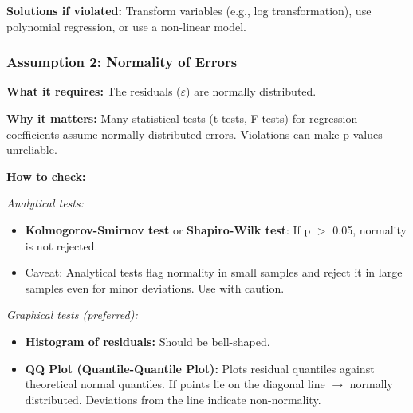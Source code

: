 \documentclass[12pt,openany]{book}
\begin{document}
\begin{center}
\end{center}



\textbf{Solutions if violated:} Transform variables (e.g., log transformation), use polynomial regression, or use a non-linear model.

\medskip


\subsubsection{Assumption 2: Normality of Errors}


\textbf{What it requires:} The residuals (\(\varepsilon\)) are normally distributed.

\textbf{Why it matters:} Many statistical tests (t-tests, F-tests) for regression coefficients assume normally distributed errors. Violations can make p-values unreliable.

\textbf{How to check:}

\textit{Analytical tests:}
\begin{itemize}[leftmargin=*]
    \item \textbf{Kolmogorov-Smirnov test} or \textbf{Shapiro-Wilk test}: If p \(>\) 0.05, normality is not rejected.
    \item Caveat: Analytical tests flag normality in small samples and reject it in large samples even for minor deviations. Use with caution.

\end{itemize}

\textit{Graphical tests (preferred):}
\begin{itemize}[leftmargin=*]
    \item \textbf{Histogram of residuals:} Should be bell-shaped.
    \item \textbf{QQ Plot (Quantile-Quantile Plot):} Plots residual quantiles against theoretical normal quantiles. If points lie on the diagonal line \(\rightarrow\) normally distributed. Deviations from the line indicate non-normality.

\end{itemize}
\end{document}
